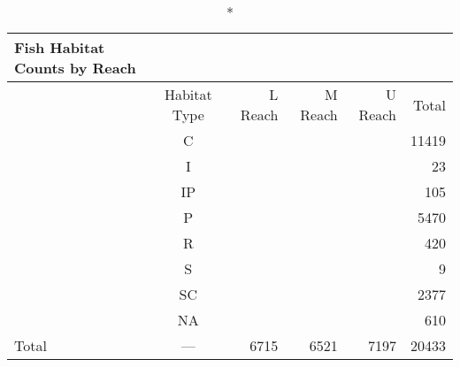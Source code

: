 \documentclass[
]{article}
\begin{document}
\begingroup
\fontsize{12.0pt}{14.4pt}\selectfont
\begin{longtable}{l|crrrr}
\caption*{
{\large Fish Habitat Counts by Reach}
} \\ 
\toprule
 & Habitat Type & L Reach & M Reach & U Reach & Total \\ 
\midrule\addlinespace[2.5pt]
 & C & {\cellcolor[HTML]{rgba(90,126,203,0.75)}{\textcolor[HTML]{FFFFFF}{3951}}} & {\cellcolor[HTML]{rgba(90,126,203,0.75)}{\textcolor[HTML]{FFFFFF}{2984}}} & {\cellcolor[HTML]{rgba(90,126,203,0.75)}{\textcolor[HTML]{FFFFFF}{4484}}} & 11419 \\ 
 & I & {\cellcolor[HTML]{rgba(192,216,240,0.75)}{\textcolor[HTML]{000000}{7}}} & {\cellcolor[HTML]{rgba(128,128,128,0.75)}{\textcolor[HTML]{FFFFFF}{NA}}} & {\cellcolor[HTML]{rgba(192,216,240,0.75)}{\textcolor[HTML]{000000}{16}}} & 23 \\ 
 & IP & {\cellcolor[HTML]{rgba(190,214,239,0.75)}{\textcolor[HTML]{000000}{79}}} & {\cellcolor[HTML]{rgba(192,216,240,0.75)}{\textcolor[HTML]{000000}{6}}} & {\cellcolor[HTML]{rgba(192,216,240,0.75)}{\textcolor[HTML]{000000}{20}}} & 105 \\ 
 & P & {\cellcolor[HTML]{rgba(163,187,229,0.75)}{\textcolor[HTML]{000000}{1218}}} & {\cellcolor[HTML]{rgba(122,151,214,0.75)}{\textcolor[HTML]{FFFFFF}{2121}}} & {\cellcolor[HTML]{rgba(146,172,223,0.75)}{\textcolor[HTML]{000000}{2131}}} & 5470 \\ 
 & R & {\cellcolor[HTML]{rgba(191,215,240,0.75)}{\textcolor[HTML]{000000}{33}}} & {\cellcolor[HTML]{rgba(189,213,239,0.75)}{\textcolor[HTML]{000000}{94}}} & {\cellcolor[HTML]{rgba(186,210,238,0.75)}{\textcolor[HTML]{000000}{293}}} & 420 \\ 
 & S & {\cellcolor[HTML]{rgba(192,216,240,0.75)}{\textcolor[HTML]{000000}{2}}} & {\cellcolor[HTML]{rgba(128,128,128,0.75)}{\textcolor[HTML]{FFFFFF}{NA}}} & {\cellcolor[HTML]{rgba(192,216,240,0.75)}{\textcolor[HTML]{000000}{7}}} & 9 \\ 
 & SC & {\cellcolor[HTML]{rgba(163,188,229,0.75)}{\textcolor[HTML]{000000}{1205}}} & {\cellcolor[HTML]{rgba(157,182,227,0.75)}{\textcolor[HTML]{000000}{1106}}} & {\cellcolor[HTML]{rgba(191,215,240,0.75)}{\textcolor[HTML]{000000}{66}}} & 2377 \\ 
 & NA & {\cellcolor[HTML]{rgba(187,211,238,0.75)}{\textcolor[HTML]{000000}{220}}} & {\cellcolor[HTML]{rgba(186,210,238,0.75)}{\textcolor[HTML]{000000}{210}}} & {\cellcolor[HTML]{rgba(188,212,239,0.75)}{\textcolor[HTML]{000000}{180}}} & 610 \\ 
\midrule 
\midrule 
Total & — & 6715 & 6521 & 7197 & 20433 \\ 
\bottomrule
\end{longtable}
\endgroup
\end{document}
